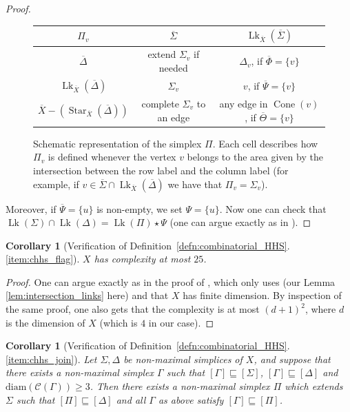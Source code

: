 \documentclass[svgnames]{amsart}
\theoremstyle{plain}
\newtheorem{cor}[thm]{Corollary}
\theoremstyle{definition}
\newcommand{\diam}{\mathrm{diam}}
\newcommand{\C}{\mathcal C}
\newcommand{\ov}[1]{\overline{#1}}
\newcommand{\nest}{\sqsubseteq}
\newcommand{\link}{\operatorname{Lk}}
\newcommand{\Squid}{\operatorname{Cone}}
\begin{document}
\begin{proof}
\begin{figure}[htp]
\centering
\renewcommand{\arraystretch}{1.5}
\begin{tabular}{c|c|c}
$\Pi_v$&$\ov\Sigma$&$\link_{\ov X}(\ov\Sigma)$\\
\hline
$\ov\Delta$& extend $\Sigma_v$ if needed&$\Delta_v$, if $\ov\Phi=\{v\}$\\
$\link_{\ov X}(\ov\Delta)$&$\Sigma_v$& $v$, if $\ov\Psi=\{v\}$\\
$\ov X- (\operatorname{Star}_{\ov X}(\ov\Delta))$&complete $\Sigma_v$ to an edge& any edge in $\Squid(v)$, if $\ov\Theta=\{v\}$
\end{tabular}
    \caption{Schematic representation of the simplex $\Pi$. Each cell describes how $\Pi_v$ is defined whenever the vertex $v$ belongs to the area given by the intersection between the row label and the column label (for example, if $v\in\ov\Sigma\cap \link_{\ov X}(\ov\Delta)$ we have that $\Pi_v=\Sigma_v$).}
    \label{tab:Sigma_star_Pi}
\end{figure}

Moreover, if $\ov\Psi=\{u\}$ is non-empty, we set $\Psi=\{u\}$. Now one can check that $\link(\Sigma)\cap\link(\Delta)=\link(\Pi)\star\Psi$ (one can argue exactly as in \cite[Lemma 5.7, \textbf{Finding the extension of $\Sigma$}]{converse}).
\end{proof}

\begin{cor}[Verification of Definition~\ref{defn:combinatorial_HHS}.\eqref{item:chhs_flag}]\label{cor:finite_complexity_HHS_blow_up}
$X$ has complexity at most $25$.
\end{cor}

\begin{proof}
One can argue exactly as in the proof of \cite[Claim 6.9]{BHMS}, which only uses \cite[Condition 6.4.B]{BHMS} (our Lemma \ref{lem:intersection_links} here) and that $X$ has finite dimension. By inspection of the same proof, one also gets that the complexity is at most $(d+1)^2$, where $d$ is the dimension of $X$ (which is $4$ in our case).
\end{proof}


\begin{cor}[Verification of Definition~\ref{defn:combinatorial_HHS}.\eqref{item:chhs_join}]\label{lem:simplicial_wedge_property}
Let $\Sigma,\Delta$ be non-maximal simplices of $X$, and suppose that there exists a non-maximal simplex $\Gamma$ such that $[\Gamma]\nest[\Sigma]$, $[\Gamma]\nest[\Delta]$ and $\diam(\C (\Gamma))\ge 3$. Then there exists a non-maximal simplex $\Pi$ which extends $\Sigma$ such that $[\Pi]\nest[\Delta]$ and all $\Gamma$ as above satisfy $[\Gamma]\nest[\Pi]$.
\end{cor}
\end{document}
